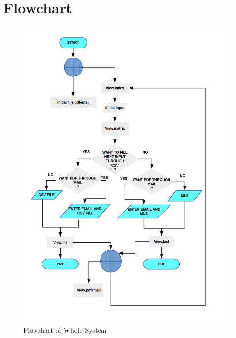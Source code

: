 \section{Flowchart}
\begin{figure}[H]
\centering \includegraphics[scale=0.26]{images/flowchart.png}
\caption{Flowchart of Whole System}
\end{figure}
